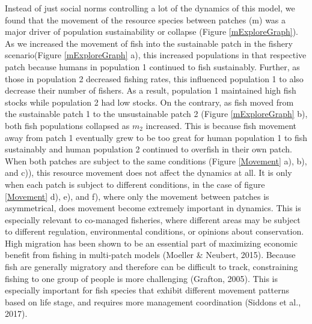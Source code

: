 \documentclass[
  12pt,
]{article}
\begin{document}
Instead of just social norms controlling a lot of the dynamics of this model, we found that the movement of the resource species between patches (m) was a major driver of population sustainability or collapse (Figure \ref{mExploreGraph}). As we increased the movement of fish into the sustainable patch in the fishery scenario(Figure \ref{mExploreGraph} a), this increased populations in that respective patch because humans in population 1 continued to fish sustainably. Further, as those in population 2 decreased fishing rates, this influenced population 1 to also decrease their number of fishers. As a result, population 1 maintained high fish stocks while population 2 had low stocks. On the contrary, as fish moved from the sustainable patch 1 to the unsustainable patch 2 (Figure \ref{mExploreGraph} b), both fish populations collapsed as \(m_2\) increased. This is because fish movement away from patch 1 eventually grew to be too great for human population 1 to fish sustainably and human population 2 continued to overfish in their own patch. When both patches are subject to the same conditions (Figure \ref{Movement} a), b), and c)), this resource movement does not affect the dynamics at all. It is only when each patch is subject to different conditions, in the case of figure \ref{Movement} d), e), and f), where only the movement between patches is asymmetrical, does movement become extremely important in dynamics. This is especially relevant to co-managed fisheries, where different areas may be subject to different regulation, environmental conditions, or opinions about conservation. High migration has been shown to be an essential part of maximizing economic benefit from fishing in multi-patch models (Moeller \& Neubert, 2015). Because fish are generally migratory and therefore can be difficult to track, constraining fishing to one group of people is more challenging (Grafton, 2005). This is especially important for fish species that exhibit different movement patterns based on life stage, and requires more management coordination (Siddons et al., 2017).
\end{document}
